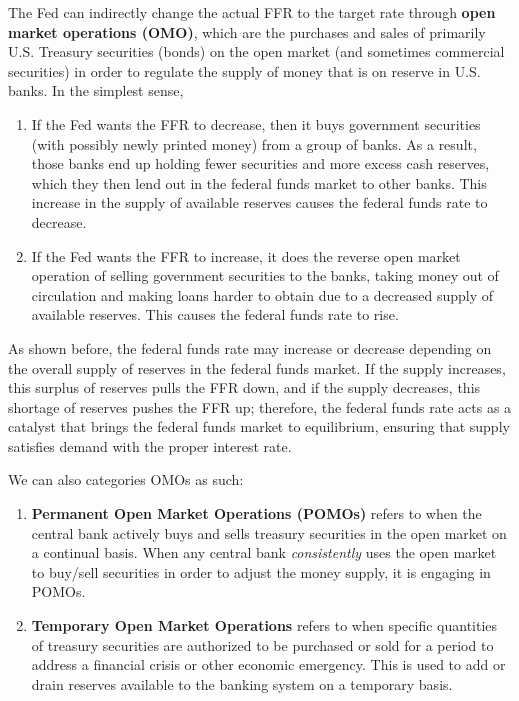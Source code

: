 \documentclass{article}
\begin{document}
      \begin{definition}
        The Fed can indirectly change the actual FFR to the target rate through \textbf{open market operations (OMO)}, which are the purchases and sales of primarily U.S. Treasury securities (bonds) on the open market (and sometimes commercial securities) in order to regulate the supply of money that is on reserve in U.S. banks. In the simplest sense, 
        \begin{enumerate}
          \item If the Fed wants the FFR to decrease, then it buys government securities (with possibly newly printed money) from a group of banks. As a result, those banks end up holding fewer securities and more excess cash reserves, which they then lend out in the federal funds market to other banks. This increase in the supply of available reserves causes the federal funds rate to decrease. 
          \item If the Fed wants the FFR to increase, it does the reverse open market operation of selling government securities to the banks, taking money out of circulation and making loans harder to obtain due to a decreased supply of available reserves. This causes the federal funds rate to rise. 
        \end{enumerate}
        As shown before, the federal funds rate may increase or decrease depending on the overall supply of reserves in the federal funds market. If the supply increases, this surplus of reserves pulls the FFR down, and if the supply decreases, this shortage of reserves pushes the FFR up; therefore, the federal funds rate acts as a catalyst that brings the federal funds market to equilibrium, ensuring that supply satisfies demand with the proper interest rate. 

        We can also categories OMOs as such: 
        \begin{enumerate}
            \item \textbf{Permanent Open Market Operations (POMOs)} refers to when the central bank actively buys and sells treasury securities in the open market on a continual basis. When any central bank \textit{consistently} uses the open market to buy/sell securities in order to adjust the money supply, it is engaging in POMOs. 
            \item \textbf{Temporary Open Market Operations} refers to when specific quantities of treasury securities are authorized to be purchased or sold for a period to address a financial crisis or other economic emergency. This is used to add or drain reserves available to the banking system on a temporary basis. 
        \end{enumerate}
      \end{definition}
\end{document}
